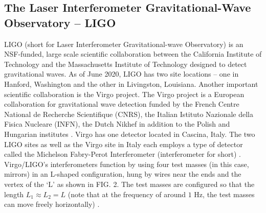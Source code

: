 \documentclass[reprint,
letterpaper,
 amsmath,amssymb,
 aps,
]{revtex4-2}
\begin{document}
\subsection{The Laser Interferometer Gravitational-Wave Observatory – LIGO}
LIGO (short for Laser Interferometer Gravitational-wave Observatory) is an NSF-funded, large scale scientific collaboration between the California Institute of Technology and the Massachusetts Institute of Technology designed to detect gravitational waves. As of June 2020, LIGO has two site locations – one in Hanford, Washington and the other in Livingston, Louisiana. Another important scientific collaboration is the Virgo project. The Virgo project is a European collaboration for gravitational wave detection funded by the French Centre National de Recherche Scientifique (CNRS), the Italian Istituto Nazionale della Fisica Nucleare (INFN), the Dutch Nikhef in addition to the Polish and Hungarian institutes \cite{collaboration2019open}. Virgo has one detector located in Cascina, Italy. The two LIGO sites as well as the Virgo site in Italy each employs a type of detector called the Michelson Fabry-Perot Interferometer (interferometer for short) \cite{creighton_anderson_2011}. Virgo/LIGO's interferometers function by using four test masses (in this case, mirrors) in an L-shaped configuration, hung by wires near the ends and the vertex of the `L' as shown in FIG. 2. The test masses are configured so that the length $L_1 \approx L_2 = L$ (note that at the frequency of around $1$ Hz, the test masses can move freely horizontally) \cite{JSTORLIGO}. 
\end{document}
